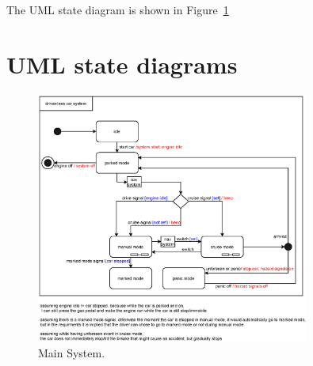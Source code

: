 \documentclass[12pt]{article}
\begin{document}
\begin{spacing}{1.5}
\noindent The UML state diagram is shown in Figure~\ref{fig:main-system-fig}\\

\newpage

\section{UML state diagrams}

\begin{figure}[h!]
	\centering
		\includegraphics[width=0.8\textwidth]{./A2_Figures/A2_SOEN331_Main.eps}
		  \caption{Main System.}
  \label{fig:main-system-fig}
\end{figure}

\end{spacing}
\end{document}
